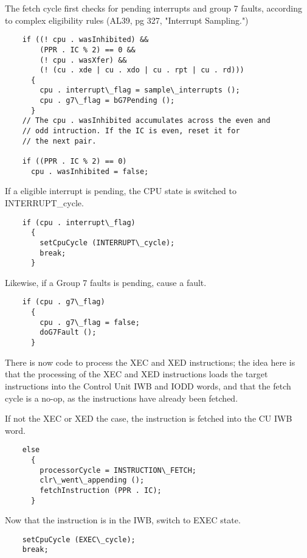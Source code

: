 \documentclass[notitlepage]{report}
\begin{document}
The fetch cycle first checks for pending interrupts and group 7 faults, 
according to complex eligibility rules (AL39, pg 327, "Interrupt Sampling.")

\begin{verbatim}
    if ((! cpu . wasInhibited) &&
        (PPR . IC % 2) == 0 &&
        (! cpu . wasXfer) &&
        (! (cu . xde | cu . xdo | cu . rpt | cu . rd)))
      {
        cpu . interrupt\_flag = sample\_interrupts ();
        cpu . g7\_flag = bG7Pending ();
      }
    // The cpu . wasInhibited accumulates across the even and 
    // odd intruction. If the IC is even, reset it for
    // the next pair.

    if ((PPR . IC % 2) == 0)
      cpu . wasInhibited = false;
\end{verbatim}

If a eligible interrupt is pending, the CPU state is switched to 
INTERRUPT\_cycle.

\begin{verbatim}
    if (cpu . interrupt\_flag)
      {
        setCpuCycle (INTERRUPT\_cycle);
        break;
      }
\end{verbatim} 

Likewise, if a Group 7 faults is pending, cause a fault.

\begin{verbatim}
    if (cpu . g7\_flag)
      {
        cpu . g7\_flag = false;
        doG7Fault ();
      }
\end{verbatim}

There is now code to process the XEC and XED instructions; the idea here is
that the processing of the XEC and XED instructions loads the target 
instructions into the Control Unit IWB and IODD words, and that the 
fetch cycle is a no-op, as the instructions have already been 
fetched.

If not the XEC or XED the case, the instruction is fetched into the
CU IWB word.

\begin{verbatim}
    else
      {
        processorCycle = INSTRUCTION\_FETCH;
        clr\_went\_appending ();
        fetchInstruction (PPR . IC);
      }
\end{verbatim}

Now that the instruction is in the IWB, switch to EXEC state.

\begin{verbatim}
    setCpuCycle (EXEC\_cycle);
    break;
\end{verbatim}
\end{document}

